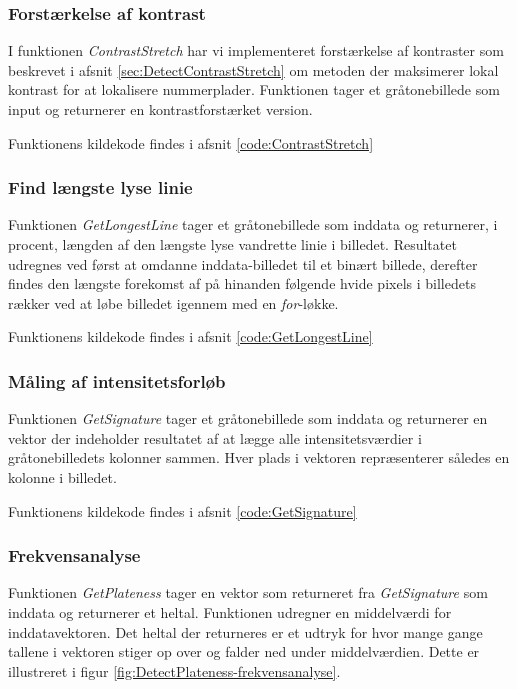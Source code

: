 \subsubsection{Forstærkelse af kontrast}
\label{sec:imp:ContrastStrech}
I funktionen \textit{ContrastStretch} har vi implementeret forstærkelse af kontraster som beskrevet i afsnit \vref{sec:DetectContrastStretch} om metoden der maksimerer lokal kontrast for at lokalisere nummerplader. Funktionen tager et gråtonebillede som input og returnerer en kontrastforstærket version. 

Funktionens kildekode findes i afsnit \vref{code:ContrastStretch}

\subsubsection{Find længste lyse linie}
\label{sec:imp:GetLongestLine}
Funktionen \textit{GetLongestLine} tager et gråtonebillede som inddata og returnerer, i procent, længden af den længste lyse vandrette linie i billedet. Resultatet udregnes ved først at omdanne inddata-billedet til et binært billede, derefter findes den længste forekomst af på hinanden følgende hvide pixels i billedets rækker ved at løbe billedet igennem med en \textit{for}-løkke.  

Funktionens kildekode findes i afsnit \vref{code:GetLongestLine}

\subsubsection{Måling af intensitetsforløb}
\label{sec:imp:GetSignature}
Funktionen \textit{GetSignature} tager et gråtonebillede som inddata og returnerer en vektor der indeholder resultatet af at lægge alle intensitetsværdier i gråtonebilledets kolonner sammen. Hver plads i vektoren repræsenterer således en kolonne i billedet.

Funktionens kildekode findes i afsnit \vref{code:GetSignature}

\subsubsection{Frekvensanalyse}
\label{sec:imp:GetPlateness}
Funktionen \textit{GetPlateness} tager en vektor som returneret fra \textit{GetSignature} som inddata og returnerer et heltal. Funktionen udregner en middelværdi for inddatavektoren. Det heltal der returneres er et udtryk for hvor mange gange tallene i vektoren stiger op over og falder ned under middelværdien. Dette er illustreret i figur \vref{fig:DetectPlateness-frekvensanalyse}.

